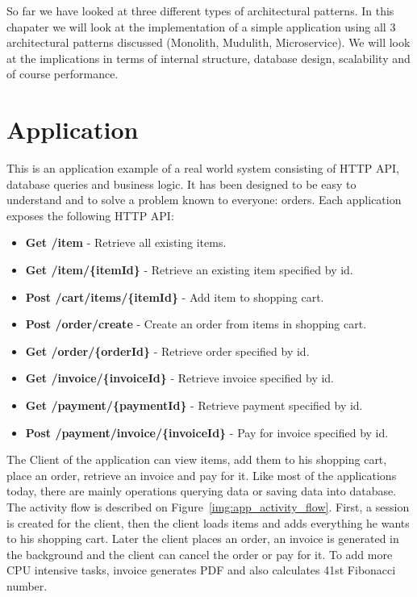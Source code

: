 

So far we have looked at three different types of architectural patterns. In this chapater we will look at the implementation of a simple application using all 3 architectural patterns discussed (Monolith, Mudulith, Microservice). We will look at the implications in terms of internal structure, database design, scalability and of course performance.

\section{Application}
This is an application example of a real world system consisting of HTTP API, database queries and business logic. It has been designed to be easy to understand and to solve a problem known to everyone: orders. Each application exposes the following HTTP API:
\begin{itemize}
    \item \textbf{Get /item} - Retrieve all existing items.
    \item \textbf{Get /item/\{itemId\}} - Retrieve an existing item specified by id.
    \item \textbf{Post /cart/items/\{itemId\}} - Add item to shopping cart.
    \item \textbf{Post /order/create} - Create an order from items in shopping cart.
    \item \textbf{Get /order/\{orderId\}} - Retrieve order specified by id.
    \item \textbf{Get /invoice/\{invoiceId\}} - Retrieve invoice specified by id.
    \item \textbf{Get /payment/\{paymentId\}} - Retrieve payment specified by id.
    \item \textbf{Post /payment/invoice/\{invoiceId\}} - Pay for invoice specified by id.
\end{itemize}

The Client of the application can view items, add them to his shopping cart, place an order, retrieve an invoice and pay for it. Like most of the applications today, there are mainly operations querying data or saving data into database. The activity flow is described on Figure~\ref{img:app_activity_flow}. First, a session is created for the client, then the client loads items and adds everything he wants to his shopping cart. Later the client places an order, an invoice is generated in the background and the client can cancel the order or pay for it. To add more CPU intensive tasks, invoice generates PDF and also calculates 41st Fibonacci number.

